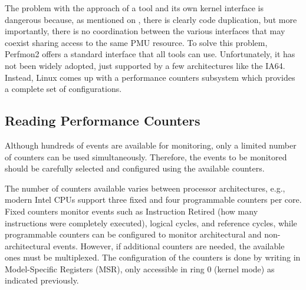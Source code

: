 The problem with the approach of a tool and its own kernel interface is dangerous because, as mentioned on \cite{Eranian2008Perfmon2}, there is clearly code duplication, but more importantly, there is no coordination between the various interfaces that may coexist sharing access to the same PMU resource. To solve this problem, Perfmon2 \cite{Eranian2008Perfmon2} offers a standard interface that all tools can use. Unfortunately, it has not been widely adopted, just supported by a few architectures like the IA64. Instead, Linux comes up with a performance counters subsystem which provides a complete set of configurations.


\subsection{Reading Performance Counters}

Although hundreds of events are available for monitoring, only a limited number of counters can be used simultaneously.
Therefore, the events to be monitored should be carefully selected and configured using the available counters.

The number of counters available varies between processor architectures, e.g., modern Intel CPUs \cite{Intel2013IntelGuide} support three fixed and four programmable counters per core. Fixed counters monitor events such as Instruction Retired (how many instructions were completely executed), logical cycles, and reference cycles, while programmable counters can be configured to monitor architectural and non-architectural events. 
However, if additional counters are needed, the available ones must be multiplexed.
The configuration of the counters is done by writing in Model-Specific Registers (MSR), only accessible in ring 0 (kernel mode) as indicated previously. 



